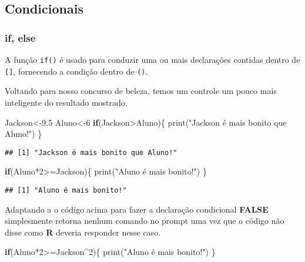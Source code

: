 \documentclass[
]{book}
\newenvironment{Shaded}{\begin{snugshade}}{\end{snugshade}}
\newcommand{\ControlFlowTok}[1]{\textcolor[rgb]{0.13,0.29,0.53}{\textbf{#1}}}
\newcommand{\DecValTok}[1]{\textcolor[rgb]{0.00,0.00,0.81}{#1}}
\newcommand{\FloatTok}[1]{\textcolor[rgb]{0.00,0.00,0.81}{#1}}
\newcommand{\FunctionTok}[1]{\textcolor[rgb]{0.00,0.00,0.00}{#1}}
\newcommand{\NormalTok}[1]{#1}
\newcommand{\OtherTok}[1]{\textcolor[rgb]{0.56,0.35,0.01}{#1}}
\newcommand{\SpecialCharTok}[1]{\textcolor[rgb]{0.00,0.00,0.00}{#1}}
\newcommand{\StringTok}[1]{\textcolor[rgb]{0.31,0.60,0.02}{#1}}
\begin{document}
\hypertarget{condicionais}{%
\subsection{Condicionais}\label{condicionais}}

\hypertarget{if-else}{%
\subsubsection{if, else}\label{if-else}}

A função \texttt{if()} é usado para conduzir uma ou mais declarações contidas dentro de \texttt{{[}{]}}, fornecendo a condição dentro de \texttt{()}.

Voltando para nosso concurso de beleza, temos um controle um pouco mais inteligente do resultado mostrado.

\begin{Shaded}
\begin{Highlighting}[]
\NormalTok{Jackson}\OtherTok{\textless{}{-}}\FloatTok{9.5}  
\NormalTok{Aluno}\OtherTok{\textless{}{-}}\DecValTok{6} 
\ControlFlowTok{if}\NormalTok{(Jackson}\SpecialCharTok{\textgreater{}}\NormalTok{Aluno)\{  }
  \FunctionTok{print}\NormalTok{(}\StringTok{"Jackson é mais bonito que Aluno!"}\NormalTok{)}
\NormalTok{  \}}
\end{Highlighting}
\end{Shaded}

\begin{verbatim}
## [1] "Jackson é mais bonito que Aluno!"
\end{verbatim}

\begin{Shaded}
\begin{Highlighting}[]
\ControlFlowTok{if}\NormalTok{(Aluno}\SpecialCharTok{*}\DecValTok{2}\SpecialCharTok{\textgreater{}=}\NormalTok{Jackson)\{}
  \FunctionTok{print}\NormalTok{(}\StringTok{"Aluno é mais bonito!"}\NormalTok{)}
\NormalTok{  \}}
\end{Highlighting}
\end{Shaded}

\begin{verbatim}
## [1] "Aluno é mais bonito!"
\end{verbatim}

Adaptando a o código acima para fazer a declaração condicional \textbf{FALSE} simplesmente retorna nenhum comando no prompt uma vez que o código não disse como \textbf{R} deveria responder nesse caso.

\begin{Shaded}
\begin{Highlighting}[]
\ControlFlowTok{if}\NormalTok{(Aluno}\SpecialCharTok{*}\DecValTok{2}\SpecialCharTok{\textgreater{}=}\NormalTok{Jackson}\SpecialCharTok{\^{}}\DecValTok{2}\NormalTok{)\{}
    \FunctionTok{print}\NormalTok{(}\StringTok{"Aluno é mais bonito!"}\NormalTok{)}
\NormalTok{  \}}
\end{Highlighting}
\end{Shaded}
\end{document}
